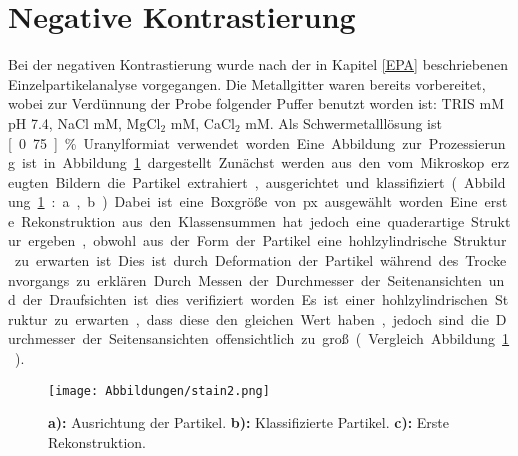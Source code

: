 \section{Negative Kontrastierung} %
\label{sec:negative_kontrastierung}

Bei der negativen Kontrastierung wurde nach der in Kapitel \ref{EPA} beschriebenen Einzelpartikelanalyse vorgegangen.
Die Metallgitter waren bereits vorbereitet, wobei zur Verdünnung der Probe folgender Puffer benutzt worden ist: TRIS \unit[50]{mM} pH 7.4, NaCl \unit[150]{mM}, MgCl$_2$ \unit[5]{mM}, CaCl$_2$ \unit[5]{mM}.
Als Schwermetalllösung ist \unit[0.75]{\%} Uranylformiat verwendet worden.
Eine Abbildung zur Prozessierung ist in Abbildung \ref{stain_schema} dargestellt.

Zunächst werden aus den vom Mikroskop erzeugten Bildern die Partikel extrahiert, ausgerichtet und klassifiziert (Abbildung \ref{stain_schema}: a
,b ).
Dabei ist eine Boxgröße von \unit[140]{px} ausgewählt worden.
Eine erste Rekonstruktion aus den Klassensummen hat jedoch eine quaderartige Struktur ergeben, obwohl aus der Form der Partikel eine hohlzylindrische Struktur zu erwarten ist.
Dies ist durch Deformation der Partikel während des Trockenvorgangs zu erklären.
Durch Messen der Durchmesser der Seitenansichten und der Draufsichten ist dies verifiziert worden.
Es ist einer hohlzylindrischen Struktur zu erwarten, dass diese den gleichen Wert haben, jedoch sind die Durchmesser der Seitensansichten offensichtlich zu groß (Vergleich Abbildung \ref{stain_schema}).

\begin{figure}
	\texttt{[image: Abbildungen/stain2.png]}
	\caption[Negativ: Weg zur ersten Rekonstruktion]{\textbf{a):} Ausrichtung der Partikel. \textbf{b):} Klassifizierte Partikel. \textbf{c):} Erste Rekonstruktion.}
	\label{stain_schema}
\end{figure}



\FloatBarrier